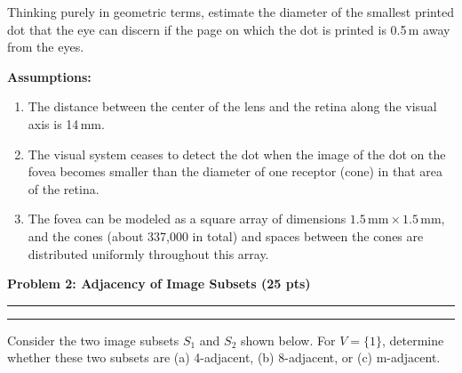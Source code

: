 \documentclass[12pt]{article}
\newcommand{\question}[1]{%
  \clearpage
  \vspace{0.5cm}
  {\noindent\normalsize \textbf{#1}}
  \vspace{0.2cm}
  \hrule
  \vspace{0.1cm}
  \hrule
  \vspace{0.3cm}
}
\begin{document}
Thinking purely in geometric terms, estimate the diameter of the smallest printed dot that the eye can discern if the page on which the dot is printed is 0.5\,m away from the eyes.

\textbf{Assumptions:}
\begin{enumerate}[label=(\alph*)]
    \item The distance between the center of the lens and the retina along the visual axis is 14\,mm.
    \item The visual system ceases to detect the dot when the image of the dot on the fovea becomes smaller than the diameter of one receptor (cone) in that area of the retina.
    \item The fovea can be modeled as a square array of dimensions $1.5\,\text{mm} \times 1.5\,\text{mm}$, and the cones (about 337{,}000 in total) and spaces between the cones are distributed uniformly throughout this array.
\end{enumerate}



\question{Problem 2: Adjacency of Image Subsets (25 pts)}\label{quest:2}

Consider the two image subsets $S_1$ and $S_2$ shown below. For $V = \{1\}$, determine whether these two subsets are (a) 4-adjacent, (b) 8-adjacent, or (c) m-adjacent.
\end{document}
